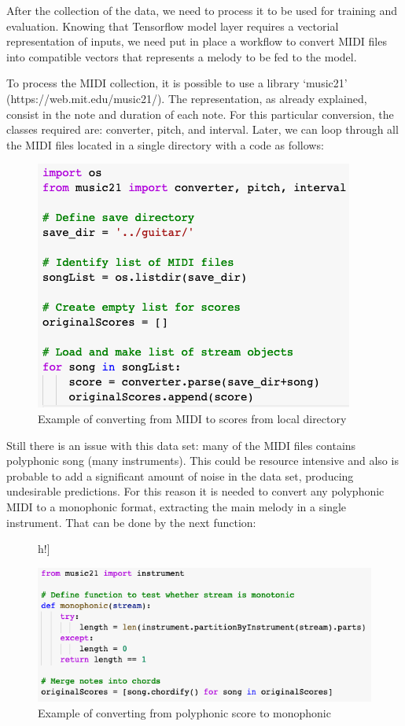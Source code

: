 After the collection of the data, we need to process it to be used for training and
evaluation. Knowing that Tensorflow model layer requires a vectorial representation of
inputs, we need put in place a workflow to convert MIDI files into compatible vectors that
represents a melody to be fed to the model.

To process the MIDI collection, it is possible to use a library ‘music21’
(https://web.mit.edu/music21/). The representation, as already explained, consist in the
note and duration of each note. For this particular conversion, the classes required are:
converter, pitch, and interval. Later, we can loop through all the MIDI files located in a
single directory with a code as follows:

\begin{figure}[h!]
  \caption{Example of converting from MIDI to scores from local directory }
  \includegraphics[width=\linewidth]{image/fig_JDF17.png}
\end{figure}


Still there is an issue with this data set: many of the MIDI files contains polyphonic
song (many instruments). This could be resource intensive and also is probable to add a
significant amount of noise in the data set, producing undesirable predictions. For this
reason it is needed to convert any polyphonic MIDI to a monophonic format, extracting the
main melody in a single instrument. That can be done by the next function:

\begin{figure}[]h!]
  \caption{Example of converting from polyphonic score to monophonic }
  \includegraphics[width=\linewidth]{image/fig_JDF18.png}
\end{figure}


